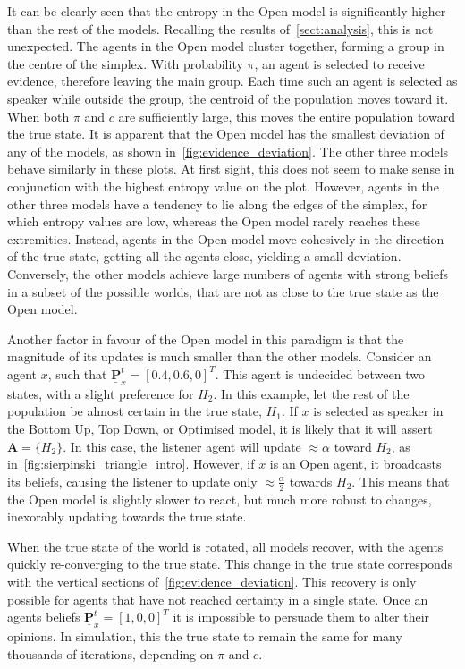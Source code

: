 It can be clearly seen that the entropy in the Open model is significantly higher than the rest of the models. Recalling the results of~\cref{sect:analysis}, this is not unexpected. The agents in the Open model cluster together, forming a group in the centre of the simplex. With probability $\pi$, an agent is selected to receive evidence, therefore leaving the main group. Each time such an agent is selected as speaker while outside the group, the centroid of the population moves toward it. When both $\pi$ and $c$ are sufficiently large, this moves the entire population toward the true state. It is apparent that the Open model has the smallest deviation of any of the models, as shown in~\cref{fig:evidence_deviation}. The other three models behave similarly in these plots. At first sight, this does not seem to make sense in conjunction with the highest entropy value on the plot. However, agents in the other three models have a tendency to lie along the edges of the simplex, for which entropy values are low, whereas the Open model rarely reaches these extremities. Instead, agents in the Open model move cohesively in the direction of the true state, getting all the agents close, yielding a small deviation. Conversely, the other models achieve large numbers of agents with strong beliefs in a subset of the possible worlds, that are not as close to the true state as the Open model. 

Another factor in favour of the Open model in this paradigm is that the magnitude of its updates is much smaller than the other models. Consider an agent $x$, such that $\underline{\mathbf{P}}^t_x = [0.4, 0.6, 0]^T$. This agent is undecided between two states, with a slight preference for $H_2$. In this example, let the rest of the population be almost certain in the true state, $H_1$. If $x$ is selected as speaker in the Bottom Up, Top Down, or Optimised model, it is likely that it will assert $\mathbf{A} = \{ H_2 \}$. In this case, the listener agent will update $\approx \alpha$ toward $H_2$, as in~\cref{fig:sierpinski_triangle_intro}. However, if $x$ is an Open agent, it broadcasts its beliefs, causing the listener to update only $\approx \frac{\alpha}{2}$ towards $H_2$. This means that the Open model is slightly slower to react, but much more robust to changes, inexorably updating towards the true state.  

When the true state of the world is rotated, all models recover, with the agents quickly re-converging to the true state. This change in the true state corresponds with the vertical sections of~\cref{fig:evidence_deviation}. This recovery is only possible for agents that have not reached certainty in a single state. Once an agents beliefs $\underline{\mathbf{P}}_x^t = [1,0,0]^T$ it is impossible to persuade them to alter their opinions. In simulation, this the true state to remain the same for many thousands of iterations, depending on $\pi$ and $c$. 



